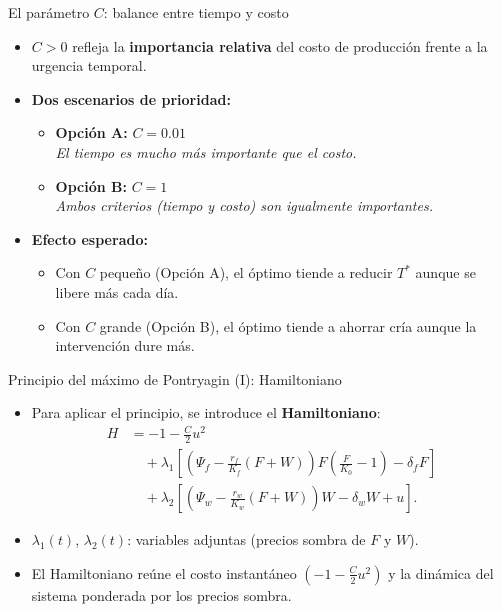 \documentclass[10pt, aspectratio=169]{beamer}
\newcommand{\tb}{\textbf}
\begin{document}
\begin{frame}{El parámetro $C$: balance entre tiempo y costo}
\begin{itemize}
    \item $C > 0$ refleja la \tb{importancia relativa} del costo de 
          producción frente a la urgencia temporal.
    \item \textbf{Dos escenarios de prioridad:}
          \begin{itemize}
              \item \textbf{Opción A:} $C = 0.01$ \\[2pt]
                    \textit{El tiempo es mucho más importante que el costo.}
              \item \textbf{Opción B:} $C = 1$ \\[2pt]
                    \textit{Ambos criterios (tiempo y costo) son igualmente importantes.}
          \end{itemize}
    \item \textbf{Efecto esperado:}
          \begin{itemize}
              \item Con $C$ pequeño (Opción A), el óptimo tiende a reducir 
                    $T^*$ aunque se libere más cada día.
              \item Con $C$ grande (Opción B), el óptimo tiende a ahorrar 
                    cría aunque la intervención dure más.
          \end{itemize}
\end{itemize}
\end{frame}
\begin{frame}{Principio del máximo de Pontryagin (I): Hamiltoniano}
\begin{itemize}
    \item Para aplicar el principio, se introduce el \tb{Hamiltoniano}:
    \begin{align*}
        H &= -1 - \frac{C}{2}u^2 \\
          &\quad + \lambda_1 \left[ \left(\Psi_f - \frac{r_f}{K_f}(F+W)\right) 
             F\left(\frac{F}{K_0}-1\right) - \delta_f F \right] \\
          &\quad + \lambda_2 \left[ \left(\Psi_w - \frac{r_w}{K_w}(F+W)\right) 
             W - \delta_w W + u \right].
    \end{align*}
    \item $\lambda_1(t)$, $\lambda_2(t)$: variables adjuntas (precios sombra 
          de $F$ y $W$).
    \item El Hamiltoniano reúne el costo instantáneo $(-1 - \frac{C}{2}u^2)$ 
          y la dinámica del sistema ponderada por los precios sombra.
\end{itemize}
\end{frame}
\end{document}
